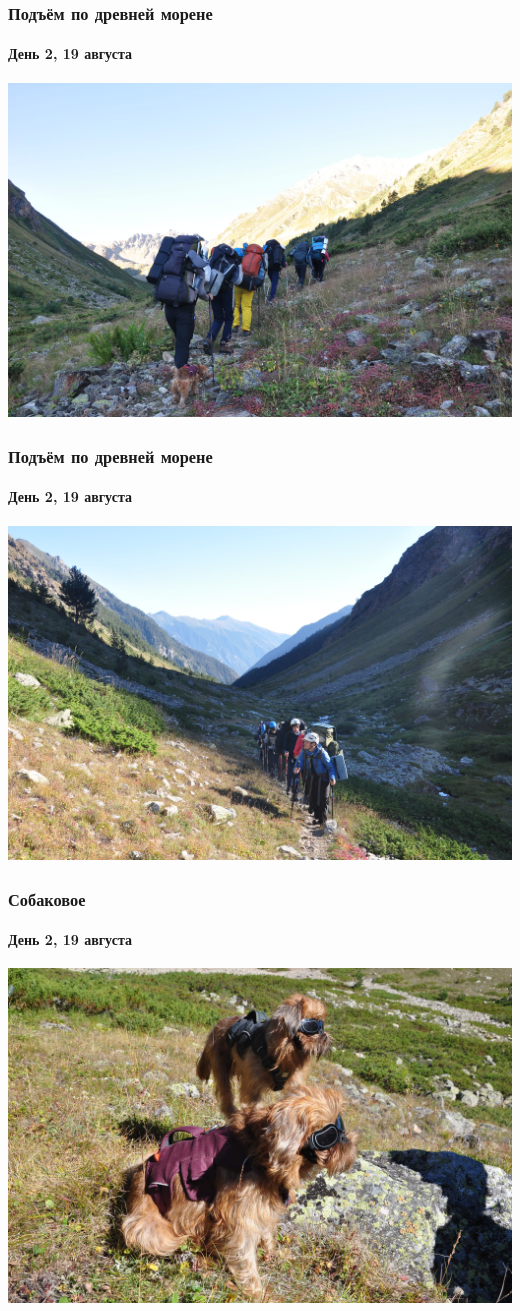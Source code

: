 \begin{frame}
	\frametitle{Подъём по древней морене}
	\framesubtitle{День 2, 19 августа}
	\centering
	\includegraphics[width=\linewidth]{../pics/DSC_0621}
\end{frame}	


\begin{frame}
	\frametitle{Подъём по древней морене}
	\framesubtitle{День 2, 19 августа}
	\centering
	\includegraphics[width=\linewidth]{../pics/DSC_0666}
	\end{frame}

\begin{frame}
	\frametitle{Собаковое}
	\framesubtitle{День 2, 19 августа}
	\centering
	\includegraphics[width=\linewidth]{../pics/DSC_0683}
	\end{frame}

